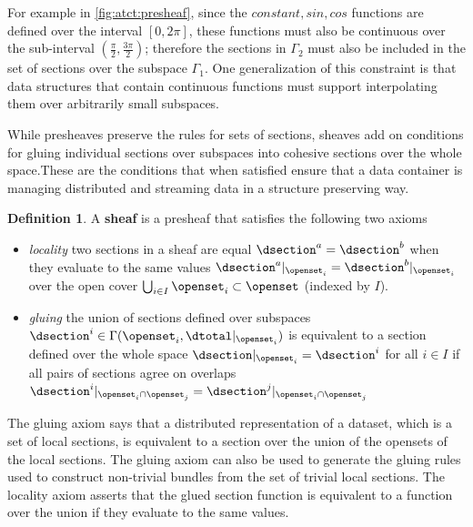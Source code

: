 \documentclass[journal]{IEEEtran}
\theoremstyle{definition}
\newtheorem{definition}{Definition}[section]
\theoremstyle{remark}
\begin{document}
For example in \autoref{fig:atct:presheaf}, since the $constant, sin, cos$ functions are defined over the interval $\left[0,2\pi\right]$, these functions must also be continuous over the sub-interval $\left(\frac{\pi}{2}, \frac{3\pi}{2}\right)$; therefore the sections in $\Gamma_{2}$ must also be included in the set of sections over the subspace $\Gamma_{1}$. One generalization of this constraint is that data structures that contain continuous functions must support interpolating them over arbitrarily small subspaces.

While presheaves preserve the rules for sets of sections, sheaves add on conditions for gluing individual sections over subspaces into cohesive sections over the whole space.These are the conditions that when satisfied ensure that a data container is managing distributed and streaming data in a structure preserving way.

\begin{definition}\label{def:atct:sheaf}\cite{bakerEuclideanSpaceMathsSheaf,spanier1989algebraic} A \textbf{sheaf} is a presheaf that satisfies the following two axioms
\begin{itemize}
  \item \textit{locality} two sections in a sheaf are equal $\dsection^{a} = \dsection^{b}$ when they evaluate to the same values $\dsection^{a}\vert_{\openset_i} =  \dsection^{b}\vert_{\openset_i}$ over the open cover $\bigcup_{i\in I} \openset_{i} \subset \openset$ (indexed by $I$).
  \item \textit{gluing} the union of sections defined over subspaces $\dsection^{i} \in \Gamma(\openset_i, \dtotal|_{\openset_i})$ is equivalent to a section defined over the whole space $\dsection\vert_{\openset_i} = \dsection^{i}$ for all $i\in I$ if all pairs of sections agree on overlaps $\dsection^{i}\vert_{\openset_i\cap\openset_j} =  \dsection^{j}\vert_{\openset_i\cap\openset_j}$
  \end{itemize}
\end{definition}

The gluing axiom says that a distributed representation of a dataset, which is a set of local sections, is equivalent to a section over the union of the opensets of the local sections. The gluing axiom can also be used to generate the gluing rules used to construct non-trivial bundles from the set of trivial local sections. The locality axiom asserts that the glued section function is equivalent to a function over the union if they evaluate to the same values.
\end{document}
